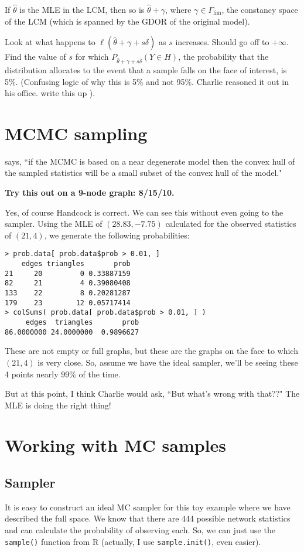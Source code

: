 \documentclass{amsbook}
\theoremstyle{definition}
\theoremstyle{remark}
\begin{document}
If $\hat{\theta}$ is the MLE in the LCM, then so is $\hat{\theta} + \gamma$, where
$\gamma \in \Gamma_{\lim}$, the constancy space of the LCM (which is spanned by the 
GDOR of the original model).

Look at what happens to $\ell(\hat{\theta} + \gamma + s \delta)$ as $s$ increases.  
Should go off to $+\infty$.  Find the value of $s$ for which $P_{\hat{\theta} + \gamma 
+ s \delta}(Y \in H )$, the probability that the distribution allocates to the event 
that a sample falls on the face of interest, is 5\%. (Confusing logic of why this is 
5\% and not 95\%.  Charlie reasoned it out in his office.  write this up ).

\section{MCMC sampling}
\citet[p. 11]{Handcock:Degeneracy} says, ``if the MCMC is based on a near degenerate 
model then the convex hull of the sampled statistics will be a small subset of the 
convex hull of the model."

\textbf{Try this out on a 9-node graph: 8/15/10.}

Yes, of course Handcock is correct.  We can see this without even going to the sampler. 
Using the MLE of $(28.83, -7.75)$ calculated for the observed statistics of $(21,4)$, 
we generate the following probabilities:
\begin{verbatim}
> prob.data[ prob.data$prob > 0.01, ]
    edges triangles       prob
21     20         0 0.33887159
82     21         4 0.39080408
133    22         8 0.20281287
179    23        12 0.05717414
> colSums( prob.data[ prob.data$prob > 0.01, ] )
     edges  triangles       prob 
86.0000000 24.0000000  0.9896627 
\end{verbatim}
These are not empty or full graphs, but these are the graphs on the face to which 
$(21,4)$ is very close.  So, assume we have the ideal sampler, we'll be seeing these 4 
points nearly 99\% of the time.  

But at this point, I think Charlie would ask, ``But what's wrong with that??"  The MLE 
is doing the right thing!  

\section{Working with MC samples}

\subsection{Sampler}
It is easy to construct an ideal MC sampler for this toy example where we have described the 
full space.  We know that there are 444 possible network statistics and can calculate 
the probability of observing each.  So, we can just use the \texttt{sample()} function 
from R (actually, I use \texttt{sample.init()}, even easier).
\end{document}
